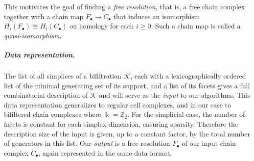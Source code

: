 \documentclass[11pt]{article}
\newcommand{\define}[1]{\emph{#1}} %
\newcommand{\field}{\Bbbk}
\begin{document}
This motivates the goal of finding a \define{free resolution}, that is, a free chain complex together with a chain map $F_\bullet\rightarrow C_\bullet$ that induces an isomorphism $H_i(F_\bullet)\cong H_i(C_\bullet)$ on homology for each $i\geq 0$.
Such a chain map is called a \define{quasi-isomorphism}.
%
%
\subparagraph{Data representation.} The list of all simplices of a bifiltration $\mathcal{K}$, each with a lexicographically ordered list of the minimal generating set of its support, and a list of its facets gives a full combinatorial description of $\mathcal{K}$ and will serve as the \define{input} to our algorithms.
This data representation generalizes to regular cell complexes, and in our case to bifiltered chain complexes where $\field=\mathbb{Z}_2$.
For the simplicial case, the number of facets is constant for each simplex dimension, ensuring sparsity.
Therefore the description size of the input is given, up to a constant factor, by the total number of generators in this list. 
Our \define{output} is a free resolution $F_\bullet$ of our input chain complex $C_\bullet$, again represented in the same data format. 
%
%
%
\end{document}
